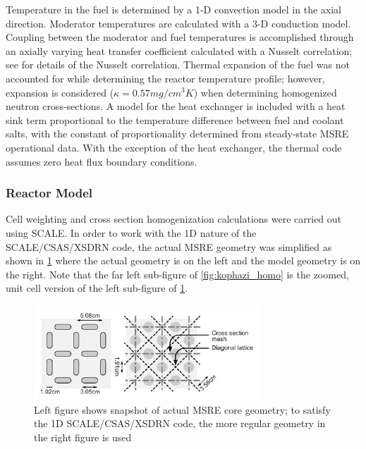 \documentclass{article}
\let\Oldsubsubsection\subsubsection
\renewcommand{\subsubsection}{\FloatBarrier\Oldsubsubsection}
\begin{document}
Temperature in the fuel is determined by a 1-D convection model in the axial
direction. Moderator temperatures are calculated with a 3-D conduction
model. Coupling between the moderator and fuel temperatures is accomplished
through an axially varying heat transfer coefficient calculated with a Nusselt
correlation; see \cite{kophazi_development_2009} for details of the Nusselt
correlation. Thermal expansion of the fuel was not accounted for while
determining the reactor temperature profile; however, expansion is considered
($\kappa = 0.57 mg/cm^3 K$) when determining homogenized neutron
cross-sections. A model for the heat exchanger is included with a heat sink term
proportional to the temperature difference between fuel and coolant salts, with
the constant of proportionality determined from steady-state \gls{MSRE} operational
data. With the exception of the heat exchanger, the thermal code assumes zero
heat flux boundary conditions.

\subsubsection{Reactor Model}

Cell weighting and cross section homogenization calculations were carried out
using SCALE. In order to work with the 1D nature of the SCALE/CSAS/XSDRN code,
the actual \gls{MSRE} geometry was simplified as shown in \cref{fig:real-vs-model}
where the actual geometry is on the left and the model geometry is on the
right. Note that the far left sub-figure of \cref{fig:kophazi_homo} is the
zoomed, unit cell version of the left sub-figure of \cref{fig:real-vs-model}.

\begin{figure}[htpb]
  \centering
  \includegraphics[max height=.5\textheight,max width=\textwidth,keepaspectratio]{kophazi-actual-vs-model-core-geometry.png}
  \caption{Left figure shows snapshot of actual \gls{MSRE} core geometry; to satisfy
    the 1D SCALE/CSAS/XSDRN code, the more regular geometry in the right figure
    is used \cite{kophazi_development_2009}}
  \label{fig:real-vs-model}
\end{figure}
\end{document}
